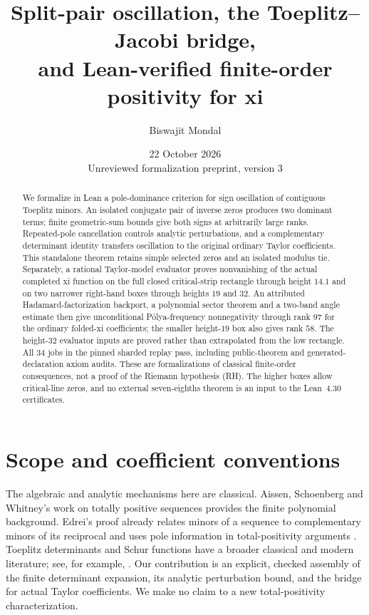 \documentclass[11pt]{amsart}
\title[Split-pair oscillation and finite-order positivity]{Split-pair oscillation, the Toeplitz--Jacobi bridge,\\and Lean-verified finite-order positivity for xi}
\author{Biswajit Mondal}
\date{22 October 2026\\Unreviewed formalization preprint, version 3}
\begin{document}
\begin{abstract}
We formalize in Lean a pole-dominance criterion for sign oscillation of contiguous Toeplitz minors. An isolated conjugate pair of inverse zeros produces two dominant terms; finite geometric-sum bounds give both signs at arbitrarily large ranks. Repeated-pole cancellation controls analytic perturbations, and a complementary determinant identity transfers oscillation to the original ordinary Taylor coefficients. This standalone theorem retains simple selected zeros and an isolated modulus tie. Separately, a rational Taylor-model evaluator proves nonvanishing of the actual completed xi function on the full closed critical-strip rectangle through height $14.1$ and on two narrower right-hand boxes through heights $19$ and $32$. An attributed Hadamard-factorization backport, a polynomial sector theorem and a two-band angle estimate then give unconditional P\'olya-frequency nonnegativity through rank $97$ for the ordinary folded-xi coefficients; the smaller height-$19$ box also gives rank $58$. The height-$32$ evaluator inputs are proved rather than extrapolated from the low rectangle. All $34$ jobs in the pinned sharded replay pass, including public-theorem and generated-declaration axiom audits. These are formalizations of classical finite-order consequences, not a proof of the Riemann hypothesis (RH). The higher boxes allow critical-line zeros, and no external seven-eighths theorem is an input to the Lean~4.30 certificates.
\end{abstract}
\maketitle

\section{Scope and coefficient conventions}
The algebraic and analytic mechanisms here are classical. Aissen, Schoenberg and Whitney's work on totally positive sequences \cite{asw} provides the finite polynomial background. Edrei's proof already relates minors of a sequence to complementary minors of its reciprocal and uses pole information in total-positivity arguments \cite{edrei}. Toeplitz determinants and Schur functions have a broader classical and modern literature; see, for example, \cite{bumpdiaconis}. Our contribution is an explicit, checked assembly of the finite determinant expansion, its analytic perturbation bound, and the bridge for actual Taylor coefficients. We make no claim to a new total-positivity characterization.
\end{document}
